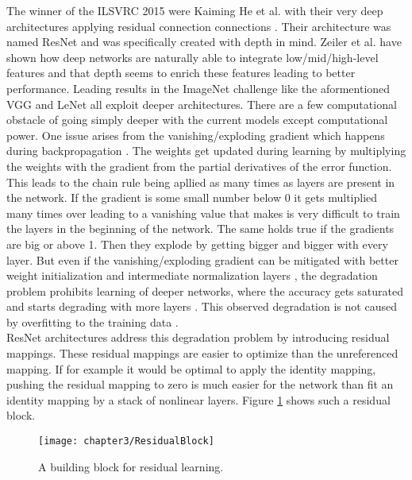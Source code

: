 The winner of the ILSVRC 2015 were Kaiming He et al. with their very deep architectures applying residual connection connections \cite{he2016deep, he2016identity}. Their architecture was named ResNet and was specifically created with depth in mind. Zeiler et al. have shown how deep networks are naturally able to integrate low/mid/high-level features and that depth seems to enrich these features leading to better performance. Leading results in the ImageNet challenge like the aformentioned VGG \cite{simonyan2014very} and LeNet \cite{szegedy2015going} all exploit deeper architectures. There are a few computational obstacle of going simply deeper with the current models except computational power. One issue arises from the vanishing/exploding gradient which happens during backpropagation \cite{glorot2010understanding}. The weights get updated during learning by multiplying the weights with the gradient from the partial derivatives of the error function. This leads to the chain rule being apllied as many times as layers are present in the network. If the gradient is some small number below 0 it gets multiplied many times over leading to a vanishing value that makes is very difficult to train the layers in the beginning of the network. The same holds true if the gradients are big or above 1. Then they explode by getting bigger and bigger with every layer. But even if the vanishing/exploding gradient can be mitigated with better weight initialization and intermediate normalization layers \cite{ioffe2015batch}, the degradation problem prohibits learning of deeper networks, where the accuracy gets saturated and starts degrading with more layers \cite{he2016deep}. This observed degradation is not caused by overfitting to the training data \cite{he2015convolutional, srivastava2015highway}.\\

ResNet architectures address this degradation problem by introducing residual mappings. These residual mappings are easier to optimize than the unreferenced mapping. If for example it would be optimal to apply the identity mapping, pushing the residual mapping to zero is much easier for the network than fit an identity mapping by a stack of nonlinear layers. Figure \ref{fig:ResidualBlock} shows such a residual block.

\begin{figure}[H]
  \centering
  \caption{A building block for residual learning. \cite{he2016deep}}
  \texttt{[image: chapter3/ResidualBlock]}
  \label{fig:ResidualBlock}
\end{figure}

